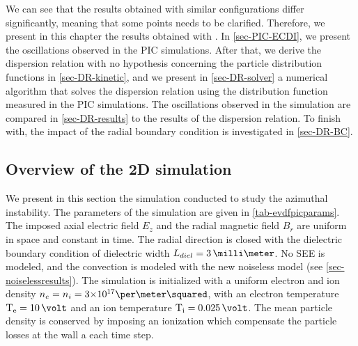     \vspace{1ex}
    We can see that the results obtained with similar configurations differ significantly, meaning that some points needs to be clarified.
    Therefore, we present in this chapter the results obtained with \LPPic.  
    In \cref{sec-PIC-ECDI}, we present the oscillations observed in the \ac{PIC} simulations.
    After that, we derive the dispersion relation with no hypothesis concerning the particle distribution functions in \cref{sec-DR-kinetic}, and we present in \cref{sec-DR-solver} a numerical algorithm that solves the dispersion relation using the distribution function measured in the \ac{PIC} simulations.
    The oscillations observed in the simulation are compared in \cref{sec-DR-results} to the results of the dispersion relation.
    To finish with, the impact of the radial boundary condition is investigated in \cref{sec-DR-BC}.


  \subsection{Overview of the 2D simulation} \label{subsec-lppic_ECDI}
  
  
  We present in this section the simulation conducted to study the azimuthal instability.
  The parameters of the simulation are given in \cref{tab-evdfpicparams}.
  The imposed axial electric field $E_z$ and the radial magnetic field $B_r$ are uniform in space and constant in time.
  The radial direction is closed with the dielectric boundary condition of dielectric width $L_{diel}=3\,\milli\meter$.
  No \ac{SEE} is modeled, and the convection is modeled with the new noiseless model (see \cref{sec-noiselessresults}).
  The simulation is initialized with a uniform electron and ion density $n_e = n_i = \sn{3}{17}\per\meter\squared$, with an electron temperature $\Te=10\,\volt$ and an ion temperature $\Ti=0.025\,\volt$.
  The mean particle density is conserved by imposing an ionization  which compensate the particle losses at the wall a each time step.
  
